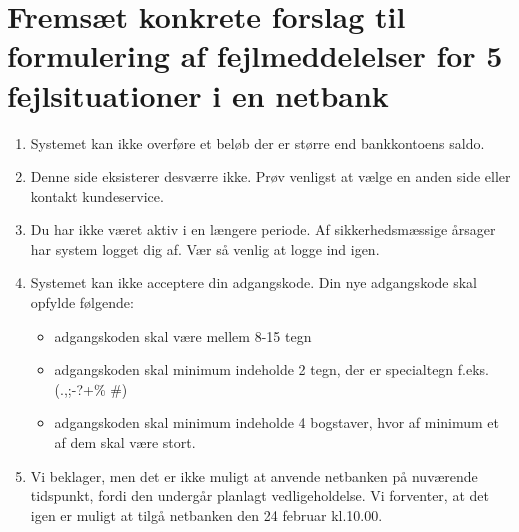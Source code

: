 \documentclass[12pt]{article}
\begin{document}
\section*{Fremsæt konkrete forslag til formulering af fejlmeddelelser
           for 5 fejlsituationer i en netbank} 
\begin{enumerate}
  \item Systemet kan ikke overføre et beløb der er større end bankkontoens saldo.
  \item Denne side eksisterer desværre ikke. Prøv venligst at vælge en anden side eller kontakt kundeservice.
  \item Du har ikke været aktiv i en længere periode. Af sikkerhedsmæssige årsager har system logget dig af. Vær så venlig at logge ind igen.
  \item Systemet kan ikke acceptere din adgangskode. Din nye adgangskode skal opfylde følgende: \begin{itemize}
    \item adgangskoden skal være mellem 8-15 tegn
    \item adgangskoden skal minimum indeholde 2 tegn, der er specialtegn f.eks. (.,;-?+\% \#)
    \item adgangskoden skal minimum indeholde 4 bogstaver, hvor af minimum et af dem skal være stort.
  \end{itemize}
\item Vi beklager, men det er ikke muligt at anvende netbanken på nuværende tidspunkt, fordi den undergår planlagt vedligeholdelse. Vi forventer, at det igen er muligt at tilgå netbanken den 24 februar kl.10.00.

\end{enumerate}
\end{document}
